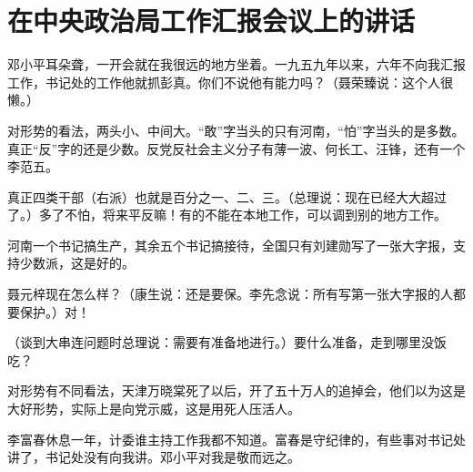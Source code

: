 \section[在中央政治局工作汇报会议上的讲话（一九六六年十月）]{在中央政治局工作汇报会议上的讲话}


邓小平耳朵聋，一开会就在我很远的地方坐着。一九五九年以来，六年不向我汇报工作，书记处的工作他就抓彭真。你们不说他有能力吗？（聂荣臻说：这个人很懒。）

对形势的看法，两头小、中间大。“敢”字当头的只有河南，“怕”字当头的是多数。真正“反”字的还是少数。反党反社会主义分子有薄一波、何长工、汪锋，还有一个李范五。

真正四类干部（右派）也就是百分之一、二、三。（总理说：现在已经大大超过了。）多了不怕，将来平反嘛！有的不能在本地工作，可以调到别的地方工作。

河南一个书记搞生产，其余五个书记搞接待，全国只有刘建勋写了一张大字报，支持少数派，这是好的。

聂元梓现在怎么样？（康生说：还是要保。李先念说：所有写第一张大字报的人都要保护。）对！

（谈到大串连问题时总理说：需要有准备地进行。）要什么准备，走到哪里没饭吃？

对形势有不同看法，天津万晓棠死了以后，开了五十万人的追掉会，他们以为这是大好形势，实际上是向党示威，这是用死人压活人。

李富春休息一年，计委谁主持工作我都不知道。富春是守纪律的，有些事对书记处讲了，书记处没有向我讲。邓小平对我是敬而远之。

